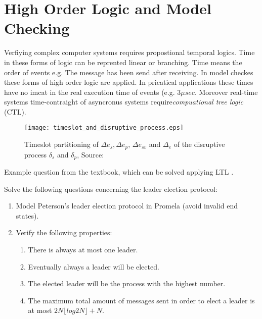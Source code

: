 \section{High Order Logic and Model Checking}
\label{sec:HighOrderLogicAndModelChecking}

Verfiying complex computer systems requires propostional temporal logics. 
Time in these forms of logic can be reprented linear or branching. Time means the order of events e.g. \glqq The message has been send after receiving. \grqq
In model checkes these forms of high order logic are applied.
In pricatical applications these times have no imcat in the real execution time of events (e.g. $3 \mu sec$. Moreover real-time systems time-contraight of asyncronus systems require{\itshape compuational tree logic} (CTL).\cite{BK}
\begin{figure}[h]
		\centering
		\texttt{[image: timeslot\_and\_disruptive\_process.eps]}
		\caption{Timeslot partitioning of  $\Delta e_s, \Delta e_p$, $\Delta e_{sv}$ and $\Delta_e$ of the disruptive process $\delta_s$ and $\delta_p$, Source: \cite{BK}}
		\label{fig:timeslots}
\end{figure}

Example question from the textbook, which can be solved applying LTL  \cite[Chapter 5]{BK}.

Solve the following questions concerning the leader election protocol:

\begin{enumerate}
	\item Model Peterson’s leader election protocol in Promela (avoid invalid end states).
	\item  Verify the following properties:
	\begin{enumerate}	
		\item There is always at most one leader.
		\item Eventually always a leader will be elected.
		\item The elected leader will be the process with the highest number.
		\item The maximum total amount of messages sent in order to elect a leader is at most $2N \lfloor log 2 N \rfloor  + N$.
	\end{enumerate}
\end{enumerate}


